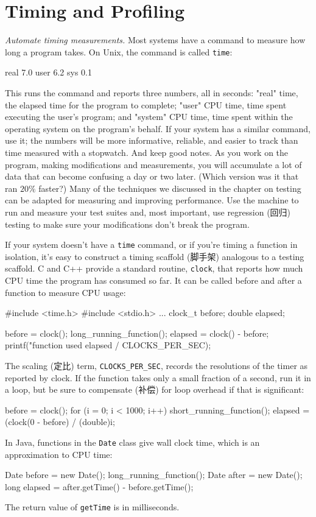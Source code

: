 \section{Timing and Profiling}
\emph{Automate timing measurements.} Most systems have a command to measure
how long a program takes. On Unix, the command is called \verb'time':
\begin{wellcode}
    real    7.0
    user    6.2
    sys     0.1
\end{wellcode}
This runs the command and reports three numbers, all in seconds: "real"
time, the elapsed time for the program to complete; "user" CPU time, time
spent executing the user's program; and "system" CPU time, time spent
within the operating system on the program's behalf. If your system has a
similar command, use it; the numbers will be more informative, reliable,
and easier to track than time measured with a stopwatch. And keep good
notes. As you work on the program, making modifications and measurements,
you will accumulate a lot of data that can become confusing a day or two
later. (Which version was it that ran $20\%$ faster?) Many of the
techniques we discussed in the chapter on testing can be adapted for
measuring and improving performance. Use the machine to run and measure
your test suites and, most important, use regression (回归) testing to make
sure your modifications don't break the program.

If your system doesn't have a \verb'time' command, or if you're timing a
function in isolation, it's easy to construct a timing scaffold (脚手架)
analogous to a testing scaffold. C and C++ provide a standard routine,
\verb'clock', that reports how much CPU time the program has consumed so
far. It can be called before and after a function to measure CPU usage:
\begin{wellcode}
    #include <time.h>
    #include <stdio.h>
        ...
        clock_t before;
        double  elapsed;

        before = clock();
        long_running_function();
        elapsed = clock() - before;
        printf("function used %
                elapsed / CLOCKS_PER_SEC);
\end{wellcode}
The scaling (定比) term, \verb'CLOCKS_PER_SEC', records the resolutions of the
timer as reported by clock. If the function takes only a small fraction of
a second, run it in a loop, but be sure to compensate (补偿) for loop
overhead if that is significant:
\begin{wellcode}
    before = clock();
    for (i = 0; i < 1000; i++)
        short_running_function();
    elapsed = (clock(0 - before) / (double)i;
\end{wellcode}
In Java, functions in the \verb'Date' class give wall clock time, which is
an approximation to CPU time:
\begin{wellcode}
    Date before = new Date();
    long_running_function();
    Date after = new Date();
    long elapsed = after.getTime() - before.getTime();
\end{wellcode}
The return value of \verb'getTime' is in milliseconds.


